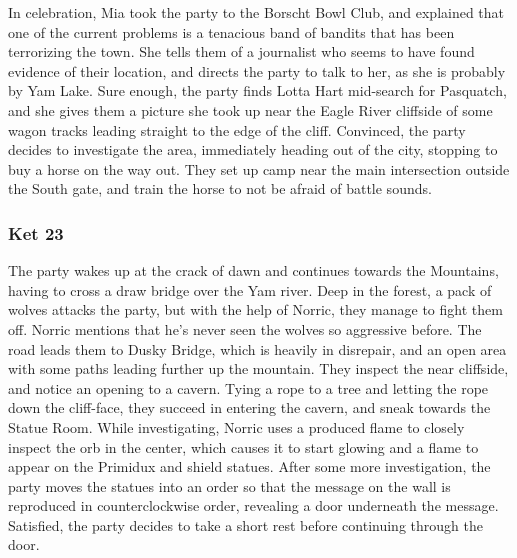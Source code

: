 In celebration, Mia took the party to the Borscht Bowl Club, and explained that one of the current problems is a tenacious band of bandits that has been terrorizing the town. She tells them of a journalist who seems to have found evidence of their location, and directs the party to talk to her, as she is probably by Yam Lake. Sure enough, the party finds Lotta Hart mid-search for Pasquatch, and she gives them a picture she took up near the Eagle River cliffside of some wagon tracks leading straight to the edge of the cliff. Convinced, the party decides to investigate the area, immediately heading out of the city, stopping to buy a horse on the way out. They set up camp near the main intersection outside the South gate, and train the horse to not be afraid of battle sounds.

\subsubsection{Ket 23}
The party wakes up at the crack of dawn and continues towards the Mountains, having to cross a draw bridge over the Yam river. Deep in the forest, a pack of wolves attacks the party, but with the help of Norric, they manage to fight them off. Norric mentions that he's never seen the wolves so aggressive before. The road leads them to Dusky Bridge, which is heavily in disrepair, and an open area with some paths leading further up the mountain. They inspect the near cliffside, and notice an opening to a cavern. Tying a rope to a tree and letting the rope down the cliff-face, they succeed in entering the cavern, and sneak towards the Statue Room. While investigating, Norric uses a produced flame to closely inspect the orb in the center, which causes it to start glowing and a flame to appear on the Primidux and shield statues. After some more investigation, the party moves the statues into an order so that the message on the wall is reproduced in counterclockwise order, revealing a door underneath the message. Satisfied, the party decides to take a short rest before continuing through the door.

